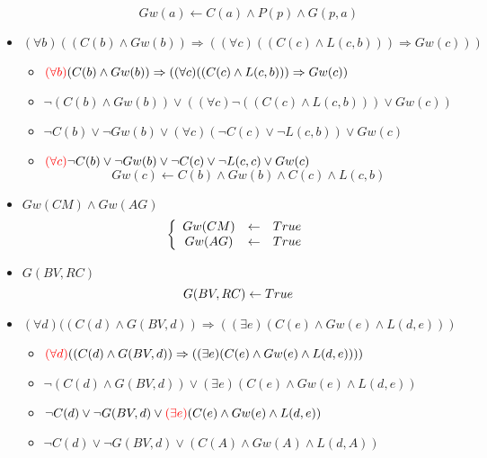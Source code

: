 \documentclass[alternative-exam.tex]{subfiles}
\begin{document}
\begin{itemize}
\begin{itemize}
\[
Gw(a)\leftarrow C(a) \wedge P(p) \wedge G(p,a)
\]
\end{itemize}
\item $(\forall b)(( C(b) \wedge Gw(b)) \Rightarrow ((\forall c)(( C(c) \wedge L(c,b)))\Rightarrow Gw(c)))$
\begin{itemize}
\item ${\color{red}(\forall b)}( C(b) \wedge Gw(b)) \Rightarrow ((\forall c)(( C(c) \wedge L(c,b)))\Rightarrow Gw(c))$

\item $\neg( C(b) \wedge Gw(b)) \vee ((\forall c)\neg(( C(c) \wedge L(c,b)))\vee Gw(c))$

\item $\neg C(b) \vee \neg Gw(b) \vee (\forall c)( \neg C(c) \vee \neg L(c,b))\vee Gw(c)$

\item ${\color{red}(\forall c)} \neg C(b) \vee \neg Gw(b) \vee \neg C(c) \vee \neg L(c,c)\vee Gw(c)$
\[
 Gw(c)\leftarrow C(b) \wedge Gw(b) \wedge C(c) \wedge L(c,b)
\]
\end{itemize}

\item $Gw(CM) \wedge Gw(AG)$
\[
\left\{
\begin{array}{c c c}
Gw(CM) &\leftarrow& True\\
Gw(AG) &\leftarrow& True\\
\end{array}
\right.
\]

\item $G(BV,RC)$
\[
G(BV,RC) \leftarrow True\\
\]

\item $(\forall d) ((C(d) \wedge G(BV,d)) \Rightarrow ((\exists e) (C(e) \wedge Gw(e) \wedge L(d,e)))$
\begin{itemize}
\item ${\color{red}(\forall d)}((C(d) \wedge G(BV,d)) \Rightarrow ((\exists e) (C(e) \wedge Gw(e) \wedge L(d,e))))$

\item $\neg (C(d) \wedge G(BV,d)) \vee (\exists e) (C(e) \wedge Gw(e) \wedge L(d,e))$

\item $\neg C(d) \vee \neg G(BV,d) \vee {\color{red} (\exists e)} (C(e) \wedge Gw(e) \wedge L(d,e))$

\item $\neg C(d) \vee \neg G(BV,d) \vee (C(A) \wedge Gw(A) \wedge  L(d,A))$


\end{itemize}
\end{itemize}
\end{document}

